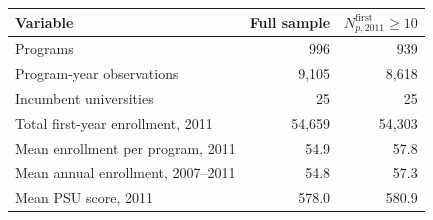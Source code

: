 \begin{tabular}{lrr}
\toprule
Variable & Full sample & \(N^{\mathrm{first}}_{p,2011}\geq10\) \\
\midrule
Programs &       996 &       939 \\
Program-year observations &     9,105 &     8,618 \\
Incumbent universities &        25 &        25 \\
Total first-year enrollment, 2011 &    54,659 &    54,303 \\
Mean enrollment per program, 2011 &  54.9 &  57.8 \\
Mean annual enrollment, 2007--2011 &  54.8 &  57.3 \\
Mean PSU score, 2011 & 578.0 & 580.9 \\
\bottomrule
\end{tabular}
